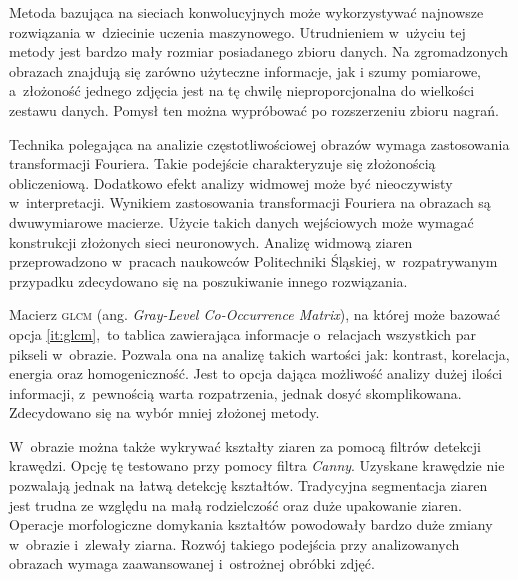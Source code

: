 Metoda bazująca na sieciach konwolucyjnych może wykorzystywać najnowsze
rozwiązania w~dziecinie uczenia maszynowego.
Utrudnieniem w~użyciu tej metody jest bardzo mały rozmiar posiadanego zbioru
danych.
Na zgromadzonych obrazach znajdują się zarówno użyteczne informacje, jak i szumy
pomiarowe, a~złożoność jednego zdjęcia jest na tę chwilę nieproporcjonalna do
wielkości zestawu danych.
Pomysł ten można wypróbować po rozszerzeniu zbioru nagrań.

Technika polegająca na analizie częstotliwościowej obrazów wymaga zastosowania
transformacji Fouriera.
Takie podejście charakteryzuje się złożonością obliczeniową.
Dodatkowo efekt analizy widmowej może być nieoczywisty w~interpretacji.
Wynikiem zastosowania transformacji Fouriera na obrazach są dwuwymiarowe
macierze.
Użycie takich danych wejściowych może wymagać konstrukcji złożonych sieci
neuronowych.
Analizę widmową ziaren przeprowadzono w~pracach naukowców Politechniki Śląskiej,
w~rozpatrywanym przypadku zdecydowano się na poszukiwanie innego rozwiązania.

Macierz \textsc{glcm} (ang. \textit{Gray-Level Co-Occurrence Matrix}), 
na której może bazować opcja \ref{it:glcm},~to tablica zawierająca informacje
o~relacjach wszystkich par pikseli w~obrazie.
Pozwala ona na analizę takich wartości jak: kontrast, korelacja, energia oraz
homogeniczność.
Jest to opcja dająca możliwość analizy dużej ilości informacji, z~pewnością
warta rozpatrzenia, jednak dosyć skomplikowana.
Zdecydowano się na wybór mniej złożonej metody.

W~obrazie można także wykrywać kształty ziaren za pomocą filtrów detekcji
krawędzi.
Opcję tę testowano przy pomocy filtra \emph{Canny}.
Uzyskane krawędzie nie pozwalają jednak na łatwą detekcję kształtów.
Tradycyjna segmentacja ziaren jest trudna ze względu na małą rodzielczość oraz
duże upakowanie ziaren.
Operacje morfologiczne domykania kształtów powodowały bardzo duże zmiany
w~obrazie i~zlewały ziarna.
Rozwój takiego podejścia przy analizowanych obrazach wymaga zaawansowanej
i~ostrożnej obróbki zdjęć.

